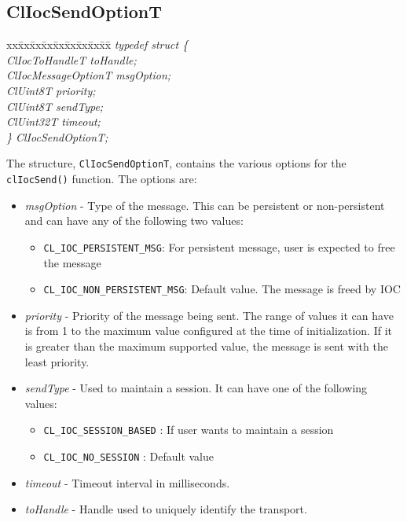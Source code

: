 \begin{flushleft}
\subsection{ClIocSendOptionT}
\begin{tabbing}
xx\=xx\=xx\=xx\=xx\=xx\=xx\=xx\=xx\=\kill
\textit{typedef struct \{}\\
\>\>\>\>\textit{ClIocToHandleT toHandle;}\\
\>\>\>\>\textit{ClIocMessageOptionT msgOption;}\\
\>\>\>\>\textit{ClUint8T priority;}\\
\>\>\>\>\textit{ClUint8T sendType;}\\
\>\>\>\>\textit{ClUint32T timeout;}\\
\textit{\} ClIocSendOptionT;}\end{tabbing}
The structure, {\tt{ClIocSendOptionT}}, contains the various options for the {\tt{clIocSend()}} function. The options are:
 \begin{itemize}
 \item
\textit{msgOption} - Type of the message. This can be persistent or non-persistent and can have any of the following two values:
\begin{itemize}
\item {\tt{CL\_\-IOC\_\-PERSISTENT\_\-MSG}}: For persistent message, user is expected to free the message
\item {\tt{CL\_\-IOC\_\-NON\_\-PERSISTENT\_\-MSG}}: Default value. The message is freed by IOC
\end{itemize}

\item
\textit{priority} - Priority of the message being sent. The range of values it can have is from 1
to the maximum value configured at the time of initialization. If it is greater than the maximum supported value, the message is sent with the
least priority.

\item
\textit{sendType} - Used to maintain a session. It can have one of the following values:
\begin{itemize}
\item {\tt{CL\_\-IOC\_\-SESSION\_\-BASED}} : If user wants to maintain a session
\item {\tt{CL\_\-IOC\_\-NO\_\-SESSION}} : Default value
\end{itemize}
\item
\textit{timeout} - Timeout interval in milliseconds.
\item
\textit{toHandle} - Handle used to uniquely identify the transport.
\end{itemize}





\end{flushleft}
